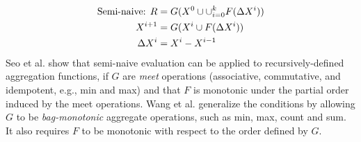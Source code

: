 



\begin{equation}
\label{eq:seminaive}
\begin{aligned}
 \text{Semi-naive:  }	R&=G(X^0\cup \cup_{i=0}^{k}F(\Delta X^i) )\notag\\
 			X^{i+1}&=G(X^i \cup F(\Delta X^i))\notag\\
    \Delta X^i&=X^i-X^{i-1}
\end{aligned}
\end{equation}
Seo et al. \cite{Lam:2013:SDE:2510649.2511289} show that semi-naive evaluation can be applied to recursively-defined aggregation functions, if $G$ are \textit{meet} operations (associative, commutative, and idempotent, e.g., min and max) and that $F$ is monotonic under the partial order induced by the meet operations. Wang et al. \cite{Wang:2015:AFR:2824032.2824052} generalize the conditions by allowing $G$ to be \textit{bag-monotonic} aggregate operations, such as min, max, count and sum. It also requires $F$ to be monotonic with respect to the order defined by $G$.

